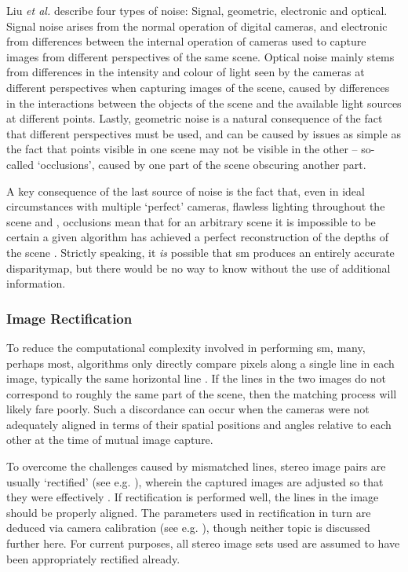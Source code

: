 Liu \textit{et al.} \cite{Liu2005} describe four types of noise:  Signal, geometric, electronic and optical.  Signal noise arises from the normal operation of digital cameras, and electronic from differences between the internal operation of cameras used to capture images from different perspectives of the same scene.  Optical noise mainly stems from differences in the intensity and colour of light seen by the cameras at different perspectives when capturing images of the scene, caused by differences in the interactions between the objects of the scene and the available light sources at different points.  Lastly, geometric noise is a natural consequence of the fact that different perspectives must be used, and can be caused by issues as simple as the fact that points visible in one scene may not be visible in the other -- so-called `occlusions', caused by one part of the scene obscuring another part.

A key consequence of the last source of noise is the fact that, even in ideal circumstances with multiple `perfect' cameras, flawless lighting throughout the scene and , occlusions mean that for an arbitrary scene it is impossible to be certain a given algorithm has achieved a perfect reconstruction of the depths of the scene \cite{Gimelfarb1998}.  Strictly speaking, it \emph{is} possible that \gls{sm} produces an entirely accurate \gls{disparitymap}, but there would be no way to know without the use of additional information.


\subsubsection{Image Rectification}
To reduce the computational complexity involved in performing \gls{sm}, many, perhaps most, algorithms only directly compare pixels along a single line in each image, typically the same horizontal line \cite[Ch. 11]{Szeliski2011}.  If the lines in the two images do not correspond to roughly the same part of the scene, then the matching process will likely fare poorly.  Such a discordance can occur when the cameras were not adequately aligned in terms of their spatial positions and angles relative to each other at the time of mutual image capture.

To overcome the challenges caused by mismatched lines, stereo image pairs are usually `rectified' (see e.g. \cite[Ch. 1.5.1]{Wohler2013}), wherein the captured images are adjusted so that they were effectively .  If rectification is performed well, the lines in the image should be properly aligned.  The parameters used in rectification in turn are deduced via camera calibration (see e.g. \cite[Ch. 1.4]{Wohler2013}), though neither topic is discussed further here.  For current purposes, all stereo image sets used are assumed to have been appropriately rectified already.

